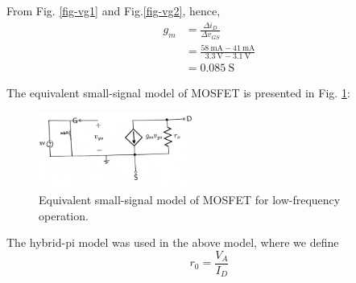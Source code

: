 \documentclass[journal]{IEEEtran}
\begin{document}
\par From Fig. \ref{fig-vg1} and Fig.\ref{fig-vg2}, hence,
\begin{equation*}
  \begin{split}
  g_{m}&=\frac{\Delta i_{D}}{\Delta v_{GS}}\\
  &=\frac{\SI{58}{\mA}-\SI{41}{\mA}}{\SI{3.3}{\V}-\SI{3.1}{\V}}\\
  &=\SI{0.085}{\siemens}
\end{split}
\end{equation*}
\par The equivalent small-signal model of MOSFET is presented in Fig. \ref{scan-1}:
\begin{figure}[h]
  \centering
  \includegraphics[width=0.45\textwidth]{images/scan-1.jpg}
  \caption{Equivalent small-signal model of MOSFET for low-frequency operation.}
  \label{scan-1}
\end{figure}
\par The hybrid-pi model was used in the above model, where we define
\begin{equation}
  r_{0}=\frac{V_{A}}{I_{D}}
\end{equation}
\end{document}
